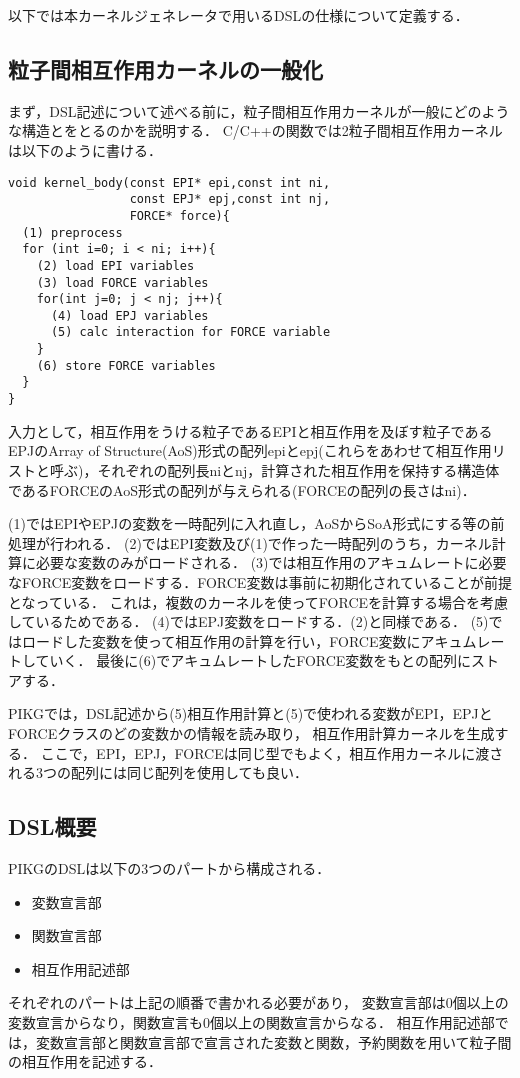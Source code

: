 \documentclass{article}
\begin{document}
以下では本カーネルジェネレータで用いるDSLの仕様について定義する．

\subsection{粒子間相互作用カーネルの一般化}
まず，DSL記述について述べる前に，粒子間相互作用カーネルが一般にどのような構造とをとるのかを説明する．
C/C++の関数では2粒子間相互作用カーネルは以下のように書ける．
\begin{verbatim}
void kernel_body(const EPI* epi,const int ni,
                 const EPJ* epj,const int nj,
                 FORCE* force){
  (1) preprocess
  for (int i=0; i < ni; i++){
    (2) load EPI variables
    (3) load FORCE variables
    for(int j=0; j < nj; j++){
      (4) load EPJ variables
      (5) calc interaction for FORCE variable
    }
    (6) store FORCE variables
  }
}
\end{verbatim}
入力として，相互作用をうける粒子であるEPIと相互作用を及ぼす粒子であるEPJのArray of Structure(AoS)形式の配列epiとepj(これらをあわせて相互作用リストと呼ぶ)，それぞれの配列長niとnj，計算された相互作用を保持する構造体であるFORCEのAoS形式の配列が与えられる(FORCEの配列の長さはni)．

(1)ではEPIやEPJの変数を一時配列に入れ直し，AoSからSoA形式にする等の前処理が行われる．
(2)ではEPI変数及び(1)で作った一時配列のうち，カーネル計算に必要な変数のみがロードされる．
(3)では相互作用のアキュムレートに必要なFORCE変数をロードする．FORCE変数は事前に初期化されていることが前提となっている．
これは，複数のカーネルを使ってFORCEを計算する場合を考慮しているためである．
(4)ではEPJ変数をロードする．(2)と同様である．
(5)ではロードした変数を使って相互作用の計算を行い，FORCE変数にアキュムレートしていく．
最後に(6)でアキュムレートしたFORCE変数をもとの配列にストアする．

PIKGでは，DSL記述から(5)相互作用計算と(5)で使われる変数がEPI，EPJとFORCEクラスのどの変数かの情報を読み取り，
相互作用計算カーネルを生成する．
ここで，EPI，EPJ，FORCEは同じ型でもよく，相互作用カーネルに渡される3つの配列には同じ配列を使用しても良い．

\subsection{DSL概要}
PIKGのDSLは以下の3つのパートから構成される．
 \begin{itemize}
  \item 変数宣言部
  \item 関数宣言部
  \item 相互作用記述部
 \end{itemize}
 それぞれのパートは上記の順番で書かれる必要があり，
 変数宣言部は0個以上の変数宣言からなり，関数宣言も0個以上の関数宣言からなる．
 相互作用記述部では，変数宣言部と関数宣言部で宣言された変数と関数，予約関数を用いて粒子間の相互作用を記述する．
\end{document}
